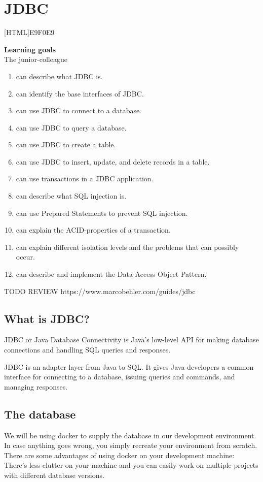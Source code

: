 \chapter{JDBC}
\label{chap:jdbc}

[HTML]{E9F0E9}{\parbox{\textwidth}{%
\noindent \textbf{Learning goals}\\
The junior-colleague
\begin{enumerate}[nolistsep]
\item can describe what JDBC is.
\item can identify the base interfaces of JDBC.
\item can use JDBC to connect to a database.
\item can use JDBC to query a database.
\item can use JDBC to create a table.
\item can use JDBC to insert, update, and delete records in a table.
\item can use transactions in a JDBC application.
\item can describe what SQL injection is.
\item can use Prepared Statements to prevent SQL injection.
\item can explain the ACID-properties of a transaction.
\item can explain different isolation levels and the problems that can possibly occur.
\item can describe and implement the Data Access Object Pattern.
\end{enumerate}}}

TODO REVIEW https://www.marcobehler.com/guides/jdbc

\section{What is JDBC?}

JDBC or Java Database Connectivity is Java's low-level API for making database connections and handling SQL queries and responses.

JDBC is an adapter layer from Java to SQL. It gives Java developers a common interface for connecting to a database, issuing queries and commands, and managing responses.


\section{The database}

We will be using docker to supply the database in our development environment.  In case anything goes wrong, you simply recreate your environment from scratch. 
There are some advantages of using docker on your development machine:
There’s less clutter on your  machine and you can easily work on multiple projects with different database versions. 

